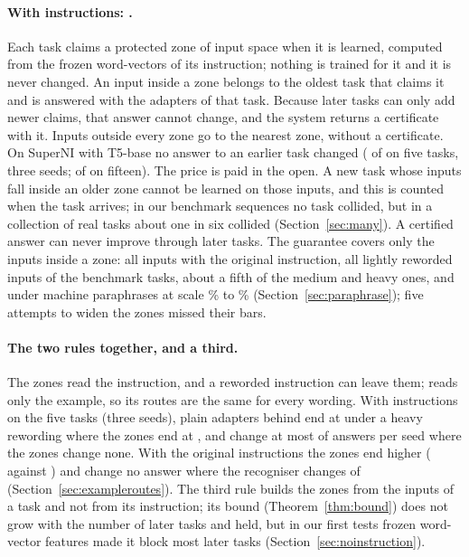 \paragraph{With instructions: \cert{}.} Each task claims a protected zone of input space when it is
learned, computed from the frozen word-vectors of its instruction; nothing is trained for it and it is
never changed. An input inside a zone belongs to the oldest task that claims it and is answered with
the adapters of that task. Because later tasks can only add newer claims, that answer cannot change,
and the system returns a certificate with it. Inputs outside every zone go to the nearest zone, without
a certificate. On SuperNI with T5-base no answer to an earlier task changed (\FiveCertChanged{} of
\FiveCertCompared{} on five tasks, three seeds; \FifteenCertChanged{} of \FifteenCertCompared{} on
fifteen). The price is paid in the open. A new task whose inputs fall inside an older zone cannot be
learned on those inputs, and this is counted when the task arrives; in our benchmark sequences no task collided, but in a collection of \ManyTasks{}
real tasks about one in six collided (Section~\ref{sec:many}). A certified answer can never improve
through later tasks. The guarantee covers only the inputs inside a zone: all inputs with the original
instruction, all lightly reworded inputs of the benchmark tasks, about a fifth of the medium and heavy ones, and under machine paraphrases at scale \WidenRefTfivePLow{}\% to \WidenRefTfivePHigh{}\%
(Section~\ref{sec:paraphrase}); five attempts to widen the zones missed their bars.

\paragraph{The two rules together, and a third.} The zones read the instruction, and a reworded
instruction can leave them; \recog{} reads only the example, so its routes are the same for every
wording. With instructions on the five tasks (three seeds), plain adapters behind \recog{} end at
\AudUThreeHeavyRidgeAPOne{} under a heavy rewording where the zones end at
\AudUThreeHeavyCertAPOne{}, and change at most \AudUThreeMaxChangedPerSeed{} of \AudUCompared{} answers
per seed where the zones change none. With the original instructions the zones end higher
(\AudUThreeOriginalCertAPOne{} against \AudUThreeOriginalRidgeAPOne{}) and change no answer where the
recogniser changes \AudUThreeOriginalRidgeChanged{} of \AudUThreeCompared{}
(Section~\ref{sec:exampleroutes}). The third rule builds the zones from the inputs of a task and not
from its instruction; its bound (Theorem~\ref{thm:bound}) does not grow with the number of later tasks and held,
but in our first tests frozen word-vector features made it block most later tasks (Section~\ref{sec:noinstruction}).

